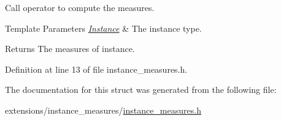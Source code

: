 Call operator to compute the measures. 


\begin{DoxyTemplParams}{Template Parameters}
{\em \hyperlink{structInstance}{Instance}} & The instance type. \\
\hline
\end{DoxyTemplParams}
\begin{DoxyReturn}{Returns}
The measures of {\ttfamily instance}. 
\end{DoxyReturn}


Definition at line 13 of file instance\+\_\+measures.\+h.



The documentation for this struct was generated from the following file\+:\begin{DoxyCompactItemize}
\item 
extensions/instance\+\_\+measures/\hyperlink{instance__measures_8h}{instance\+\_\+measures.\+h}\end{DoxyCompactItemize}
